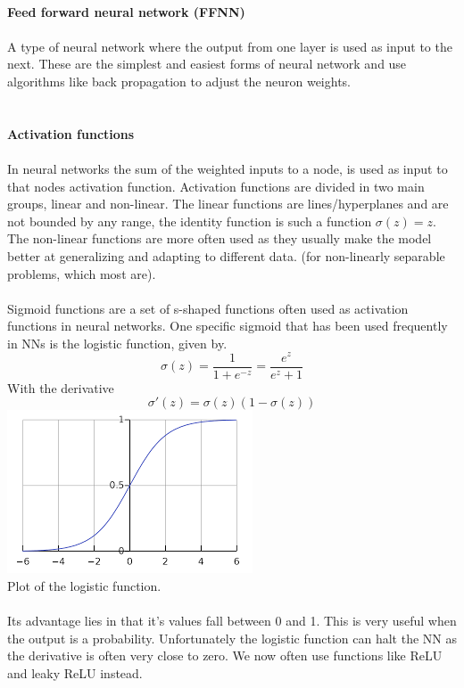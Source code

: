 \documentclass[12pt, letterpaper, twoside]{article}
\begin{document}
\newpage
\ \\
\textbf{Feed forward neural network (FFNN)}\\ 
\ \\
A type of neural network where the output from one layer is used as input to the next. These are the simplest and easiest forms of neural network and use algorithms like back propagation to adjust the neuron weights.\\
\ \\
\ \\
\textbf{Activation functions}\\
\ \\
In neural networks the sum of the weighted inputs to a node, is used as input to that nodes activation function. Activation functions are divided in two main groups, linear and non-linear. The linear functions are lines/hyperplanes and are not bounded by any range, the identity function is such a function $\sigma(z) = z$.\\
The non-linear functions are more often used as they usually make the model better at generalizing and adapting to different data. (for non-linearly separable problems, which most are).\\
\ \\
Sigmoid functions are a set of s-shaped functions often used as activation functions in neural networks. One specific sigmoid that has been used frequently in NNs is the logistic function, given by.
$$
\sigma(z) = \frac{1}{1 + e^{-z}} = \frac{e^z}{e^z + 1}
$$
With the derivative
$$
\sigma'(z) = \sigma(z)(1 - \sigma(z))
$$
\includegraphics[scale=1]{"log_func"}\\
Plot of the logistic function.\\
\ \\
Its advantage lies in that it's values fall between 0 and 1. This is very useful when the output is a probability. Unfortunately the logistic function can halt the NN as the derivative is often very close to zero. We now often use functions like ReLU and leaky ReLU instead.\\
\end{document}

